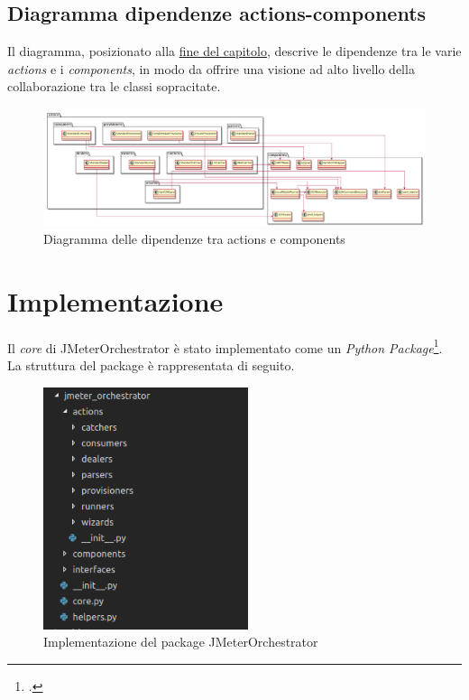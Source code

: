 \subsection{Diagramma dipendenze actions-components}
Il diagramma, posizionato alla \hyperref[img-actioncomponents]{fine del capitolo}, descrive le dipendenze tra le varie \textit{actions} e i \textit{components}, in modo da offrire una visione ad alto livello della collaborazione tra le classi sopracitate.
\begin{figure}
	\centering
	\includegraphics[width=\textwidth]{immagini/actionscomponents}
	\caption{Diagramma delle dipendenze tra actions e components}
	\label{img-actioncomponents}
\end{figure}
\section{Implementazione}
Il \textit{core} di JMeterOrchestrator è stato implementato come un \textit{Python Package}\footcite{article:pypackage}. \\
La struttura del package è rappresentata di seguito.
\begin{figure}[H]
	\centering
	\includegraphics[width=6cm]{immagini/implementation}
	\caption{Implementazione del package JMeterOrchestrator}
	\label{img-implementation}
\end{figure}
